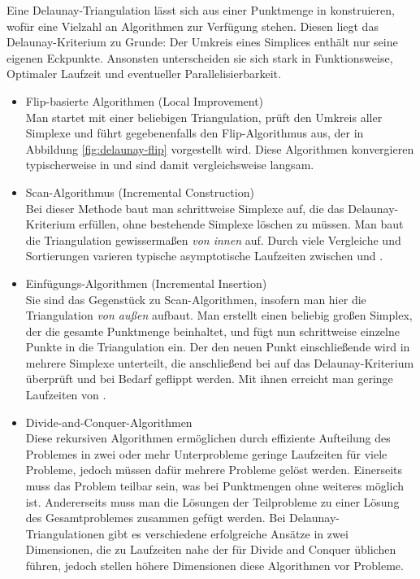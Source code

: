 Eine Delaunay-Triangulation lässt sich aus einer Punktmenge in  konstruieren, wofür eine Vielzahl an Algorithmen zur Verfügung stehen. 
Diesen liegt das Delaunay-Kriterium zu Grunde:
Der Umkreis eines Simplices enthält nur seine eigenen Eckpunkte.
Ansonsten unterscheiden sie sich stark in Funktionsweise, Optimaler Laufzeit  und eventueller Parallelisierbarkeit.

\begin{itemize}
\item Flip-basierte Algorithmen (Local Improvement)\\
Man startet mit einer beliebigen Triangulation, prüft den Umkreis aller Simplexe und führt gegebenenfalls den Flip-Algorithmus aus, der in Abbildung \ref{fig:delaunay-flip} vorgestellt wird.
Diese Algorithmen konvergieren typischerweise in  und sind damit vergleichsweise langsam.

\item Scan-Algorithmus (Incremental Construction)\\
Bei dieser Methode baut man schrittweise Simplexe auf, die das Delaunay-Kriterium erfüllen, ohne bestehende Simplexe löschen zu müssen.
Man baut die Triangulation gewissermaßen \textit{von innen} auf.
Durch viele Vergleiche und Sortierungen varieren typische asymptotische Laufzeiten zwischen  und .

\item Einfügungs-Algorithmen (Incremental Insertion)\\
Sie sind das Gegenstück zu Scan-Algorithmen, insofern man hier die Triangulation \textit{von außen} aufbaut.
Man erstellt einen beliebig großen Simplex, der die gesamte Punktmenge beinhaltet, und fügt nun schrittweise einzelne Punkte in die Triangulation ein.
Der den neuen Punkt einschließende wird in mehrere Simplexe unterteilt, die anschließend bei auf das Delaunay-Kriterium überprüft und bei Bedarf geflippt werden.
Mit ihnen erreicht man geringe Laufzeiten von .

\item Divide-and-Conquer-Algorithmen\\
Diese rekursiven Algorithmen ermöglichen durch effiziente Aufteilung des Problemes in zwei oder mehr Unterprobleme geringe Laufzeiten für viele Probleme, jedoch müssen dafür mehrere Probleme gelöst werden.
Einerseits muss das Problem teilbar sein, was bei Punktmengen ohne weiteres möglich ist.
Andererseits muss man die Lösungen der Teilprobleme zu einer Lösung des Gesamtproblemes zusammen gefügt werden.
Bei Delaunay-Triangulationen gibt es verschiedene erfolgreiche Ansätze in zwei Dimensionen, die zu Laufzeiten nahe der für Divide and Conquer üblichen  führen, jedoch stellen höhere Dimensionen diese Algorithmen vor Probleme.


\end{itemize}
